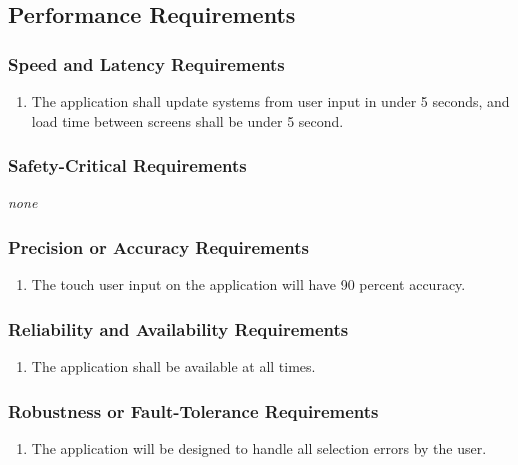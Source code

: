 \documentclass[12pt, titlepage]{article}
\begin{document}

\subsection{Performance Requirements}
\label{sub:performance_requirements}

\subsubsection{Speed and Latency Requirements}
\label{ssub:speed_and_latency_requirements}
\begin{enumerate}[{PR}1. ]
	\item The application shall update systems from user input in under 5 seconds, and load time between screens shall be under 5 second.
\end{enumerate}

\subsubsection{Safety-Critical Requirements}
\label{ssub:safety_critical_requirements}
\emph{none}

\subsubsection{Precision or Accuracy Requirements}
\label{ssub:precision_or_accuracy_requirements}
\begin{enumerate}[{PR}2. ]
	\item The touch user input on the application will have 90 percent accuracy.
\end{enumerate}

\subsubsection{Reliability and Availability Requirements}
\label{ssub:reliability_and_availability_requirements}
\begin{enumerate}[{PR}1. ]
	\item The application shall be available at all times.
\end{enumerate}

\subsubsection{Robustness or Fault-Tolerance Requirements}
\label{ssub:robustness_or_fault_tolerance_requirements}
\begin{enumerate}[{PR}3. ]
	\item The application will be designed to handle all selection errors by the user.
\end{enumerate}
\end{document}

